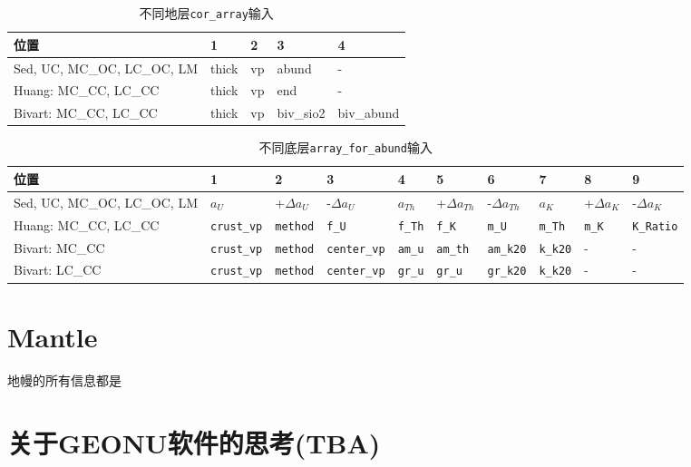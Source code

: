 				\begin{table}
					\centering
					\caption{不同地层\texttt{cor\_array}输入}
					\begin{tabular}{p{6cm}|p{2cm}p{2cm}p{2cm}p{2cm}}
						\hline
						\hline
						位置 & 1 & 2 & 3 & 4\\
						\hline
						Sed, UC, MC\_OC, LC\_OC, LM & thick & vp & abund & -\\
						\hline
						Huang: MC\_CC, LC\_CC & thick & vp & end & -\\
						\hline
						Bivart: MC\_CC, LC\_CC & thick & vp & biv\_sio2 & biv\_abund\\
						\hline
						\hline
					\end{tabular}
				\end{table}
				\begin{table}[H]
					\centering
					\caption{不同底层\texttt{array\_for\_abund}输入}
					\begin{tabular}{p{3.5cm}| p{1.5cm} p{1cm} p{1.5cm} p{1cm} p{1cm} p{1.2cm} p{1cm} p{1cm} p{1cm}}
						\hline
						\hline
						位置 & 1 & 2 & 3 & 4 & 5 & 6 & 7 & 8 & 9\\
						\hline
						Sed, UC, MC\_OC, LC\_OC, LM & $a_U$ & +$\Delta a_U$ & -$\Delta a_U$ & $a_{Th}$ & +$\Delta a_{Th} $ & -$\Delta a_{Th}$ & $a_K$ & +$\Delta a_K$ & -$\Delta a_K$\\
						\hline
						Huang: MC\_CC, LC\_CC & \texttt{crust\_vp} & \texttt{method} & \texttt{f\_U} & \texttt{f\_Th} & \texttt{f\_K} & \texttt{m\_U} & \texttt{m\_Th} & \texttt{m\_K} & \texttt{K\_Ratio}\\
						\hline
						Bivart: MC\_CC & \texttt{crust\_vp} & \texttt{method} & \texttt{center\_vp} & \texttt{am\_u} & \texttt{am\_th} & \texttt{am\_k20} & \texttt{k\_k20} & - & -\\
						Bivart: LC\_CC & \texttt{crust\_vp} & \texttt{method} & \texttt{center\_vp} & \texttt{gr\_u} & \texttt{gr\_u} & \texttt{gr\_k20} & \texttt{k\_k20} & - & -\\
						\hline
						\hline
					\end{tabular}
				\end{table}
		\section{Mantle}
			地幔的所有信息都是
		\section{关于GEONU软件的思考(TBA)}
				
